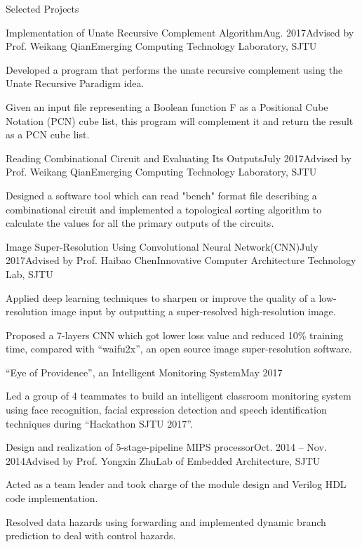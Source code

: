 \documentclass{resume_Stanford} %
\begin{document}
\begin{rSection}{Selected Projects}
\begin{rSubsection}{Implementation of Unate Recursive Complement Algorithm}{Aug. 2017}{Advised by Prof. Weikang Qian}{Emerging Computing Technology Laboratory, SJTU}
\item Developed a program that performs the unate recursive complement using the Unate Recursive Paradigm idea.
\item Given an input file representing a Boolean function F as a Positional Cube Notation (PCN) cube list, this program will complement it and return the result as a PCN cube list.
\end{rSubsection}

\begin{rSubsection}{Reading Combinational Circuit and Evaluating Its Outputs}{July 2017}{Advised by Prof. Weikang Qian}{Emerging Computing Technology Laboratory, SJTU}
\item Designed a software tool which can read "bench" format file describing a combinational circuit and implemented a topological sorting algorithm to calculate the values for all the primary outputs of the circuits.
\end{rSubsection}

\begin{rSubsection}{Image Super-Resolution Using Convolutional Neural Network(CNN)}{July 2017}{Advised by Prof. Haibao Chen}{Innovative Computer Architecture Technology Lab, SJTU}
\item Applied deep learning techniques to sharpen or improve the quality of a low-resolution image input by outputting a super-resolved high-resolution image. 
\item Proposed a 7-layers CNN which got lower loss value and reduced 10\% training time, compared with ``waifu2x'', an open source image super-resolution software.
\end{rSubsection}

\begin{rSubsection}{``Eye of Providence'', an Intelligent Monitoring System}{May 2017}{}{}
\item Led a group of 4 teammates to build an intelligent classroom monitoring system using face recognition, facial expression detection and speech identification techniques during ``Hackathon SJTU 2017''.
\end{rSubsection}

\begin{rSubsection}{Design and realization of 5-stage-pipeline MIPS processor}{Oct. 2014 -- Nov. 2014}{Advised by Prof. Yongxin Zhu}{Lab of Embedded Architecture, SJTU}
\item Acted as a team leader and took charge of the module design and Verilog HDL code implementation. 
\item Resolved data hazards using forwarding and implemented dynamic branch prediction to deal with control hazards.
\end{rSubsection}
\end{rSection}
\end{document}
